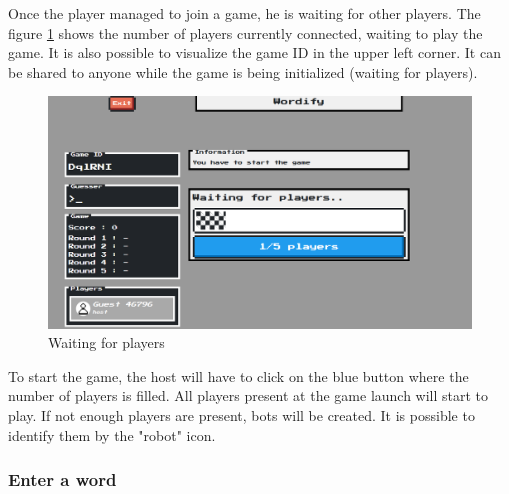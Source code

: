 \documentclass{tnreport}
\begin{document}
Once the player managed to join a game, he is waiting for other players. The figure \ref{fig:waiting_players} shows the number of players currently connected, waiting to play the game. It is also possible to visualize the game ID in the upper left corner. It can be shared to anyone while the game is being initialized (waiting for players). 

\vspace*{0.1cm}

\begin{figure}[ht]
	\centering
	\fboxsep=1.2pt
	\includegraphics[scale=0.44]{figures/waiting_players}
	\caption{Waiting for players}
	\label{fig:waiting_players}
\end{figure} 

To start the game, the host will have to click on the blue button where the number of players is filled. All players present at the game launch will start to play. If not enough players are present, bots will be created. It is possible to identify them by the "robot" icon. 

\subsubsection{Enter a word}
\end{document}
